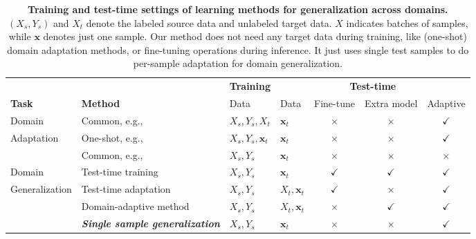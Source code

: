 \documentclass{article} \usepackage[table]{xcolor}
\newcommand{\x}{\mathbf{x}}
\begin{document}
\begin{table}[t]
\small
\vspace{-4mm}
\centering
\caption{
\textbf{Training and test-time settings of learning methods for generalization across domains.} $(X_s, Y_s)$ and $X_{t}$ denote the labeled source data and unlabeled target data. $X$ indicates batches of samples, while $\x$ denotes just one sample. 
Our method does not need any target data during training, like (one-shot) domain adaptation methods, or fine-tuning operations during inference. It just uses single test samples to do per-sample adaptation for domain generalization. 
}
\vspace{-2mm}
\begin{adjustbox}{max width =\textwidth}
\begin{tabular}{llllccc}
\toprule
& & \textbf{Training} & \multicolumn{4}{c}{\textbf{Test-time}} \\
\cmidrule(lr){3-3} 
\cmidrule(lr){4-7}
\textbf{Task} & \textbf{Method} & Data & Data & Fine-tune & Extra model & Adaptive   \\ \midrule
Domain & Common, e.g.,~\citep{long2015learning} & $X_s, Y_s, X_{t}$  & $\x_{t}$ & $\times$ & $\times$ & $\checkmark$\\
Adaptation & One-shot, e.g.,~\citep{luo2020adversarial} & $X_s, Y_s, \x_{t}$ & $\x_{t}$ & $\times$ & $\times$ & $\checkmark$ \\
\midrule
 & Common, e.g.,~\citep{seo2020learning} & $X_s, Y_s$ & $\x_{t}$ & $\times$ & $\times$ & $\times$\\
Domain & Test-time training \citep{sun2020test} & $X_s, Y_s$ & $\x_{t}$ & $\checkmark$ & $\checkmark$ & $\checkmark$\\
Generalization & Test-time adaptation \citep{wang2021tent} & $X_s, Y_s$ & $X_{t}, \x_{t}$ & $\checkmark$ & $\times$ & $\checkmark$\\
 & Domain-adaptive method \citep{dubey2021adaptive} & $X_s, Y_s$ & $X_{t}, \x_{t}$ & $\times$ & $\checkmark$ & $\checkmark$ \\
& \textit{\textbf{Single sample generalization}} & $X_s, Y_s$ & $\x_{t}$ & $\times$ & $\times$ & $\checkmark$ \\
\bottomrule
\end{tabular}
\end{adjustbox}
\vspace{-2mm}
\label{settings}
\vspace{-4mm}
\end{table}
\end{document}
